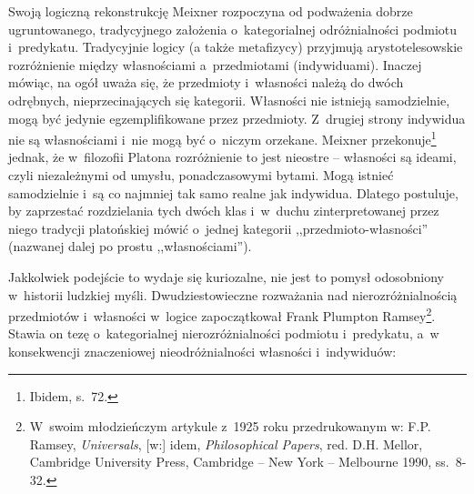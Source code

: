 Swoją logiczną rekonstrukcję Meixner rozpoczyna od podważenia dobrze ugruntowanego, tradycyjnego założenia o~kategorialnej odróżnialności podmiotu i~predykatu. Tradycyjnie logicy (a także metafizycy) przyjmują arystotelesowskie rozróżnienie między własnościami a~przedmiotami (indywiduami). Inaczej mówiąc, na ogół uważa się, że przedmioty i~własności należą do dwóch odrębnych, nieprzecinających się kategorii. Własności nie istnieją samodzielnie, mogą być jedynie egzemplifikowane przez przedmioty. Z~drugiej strony indywidua nie są własnościami i~nie mogą być o~niczym orzekane. Meixner przekonuje\footnote{Ibidem, s.~72.} jednak, że w~filozofii Platona rozróżnienie to jest nieostre -- własności są ideami, czyli niezależnymi od umysłu, ponadczasowymi bytami. Mogą istnieć samodzielnie i~są co najmniej tak samo realne jak indywidua. Dlatego postuluje, by zaprzestać rozdzielania tych dwóch klas i~w~duchu zinterpretowanej przez niego tradycji platońskiej mówić o~jednej kategorii ,,przedmioto-własności'' (nazwanej dalej po prostu ,,własnościami'').

Jakkolwiek podejście to wydaje się kuriozalne, nie jest to pomysł odosobniony w~historii ludzkiej myśli. Dwudziestowieczne rozważania nad nierozróżnialnością przedmiotów i~własności w~logice zapoczątkował Frank Plumpton Ramsey\footnote{W~swoim młodzieńczym artykule z~1925 roku przedrukowanym w: F.P. Ramsey, \textit{Universals}, [w:] idem, \textit{Philosophical Papers}, red. D.H. Mellor, Cambridge University Press, Cambridge -- New York -- Melbourne 1990, ss.~8-32.}. Stawia on tezę o~kategorialnej nierozróżnialności podmiotu i~predykatu, a~w konsekwencji znaczeniowej nieodróżnialności własności i~indywiduów:

